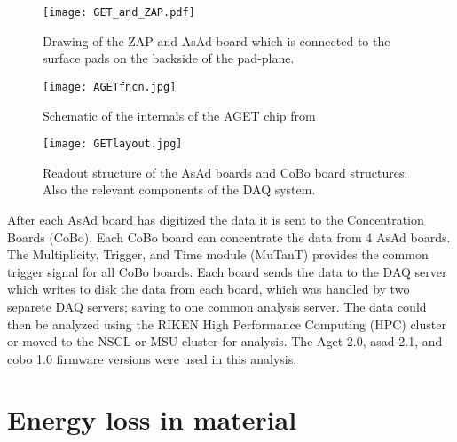 \begin{figure}[!htb]
\centering
\texttt{[image: GET\_and\_ZAP.pdf]}
\caption{Drawing of the ZAP and AsAd board which is connected to the surface pads on the backside of the pad-plane.}
\label{fig:getzap}
\end{figure}



\begin{figure}[!htb]
\centering
\texttt{[image: AGETfncn.jpg]}
\caption{Schematic of the internals of the AGET chip from \cite{get2}}
\label{fig:aget}
\end{figure}


\begin{figure}[!htb]
\centering
\texttt{[image: GETlayout.jpg]}
\caption{Readout structure of the AsAd boards and CoBo board structures. Also the relevant components of the DAQ system.}
\label{fig:coboDAQ}
\end{figure}

After each AsAd board has digitized the data it is sent to the Concentration Boards (CoBo). Each CoBo board can concentrate the data from 4 AsAd boards. The Multiplicity, Trigger, and Time module (MuTanT) \cite{get} provides the common trigger signal for all CoBo boards.  Each board sends the data to the DAQ server which writes to disk the data from each board, which was handled by two separete DAQ servers; saving to one common analysis server. The data could then be analyzed using the RIKEN High Performance Computing (HPC) cluster or moved to the NSCL or MSU cluster for analysis. The Aget 2.0, asad 2.1, and cobo 1.0 firmware versions were used in this analysis. 

\section{Energy loss in material}
\label{sec:energyloss}

